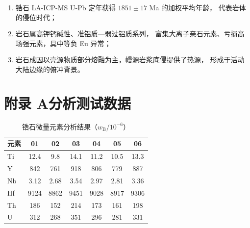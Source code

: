 \documentclass[master]{cugthesis}
\begin{document}
\begin{enumerate}
    \item 锆石 LA-ICP-MS U-Pb 定年获得 $1851\pm17$ Ma 的加权平均年龄，
        代表岩体的侵位时代；
    \item 岩石属高钾钙碱性、准铝质—弱过铝质系列，
        富集大离子亲石元素、亏损高场强元素，具中等负 Eu 异常；
    \item 岩石成因以壳源物质部分熔融为主，幔源岩浆底侵提供了热源，
        形成于活动大陆边缘的俯冲背景。
\end{enumerate}

\backmatter
\cugthesisacknowledgements

\appendix
\chapter{附录 A\quad 分析测试数据}

\begin{table}[htbp]
    \centering
    \caption{锆石微量元素分析结果（$w_\mathrm{B}$/$10^{-6}$）}
    \label{tab:appendix}
    \small
    \begin{tabular}{lcccccc}
        \toprule
        元素 & 01 & 02 & 03 & 04 & 05 & 06 \\
        \midrule
        Ti  & 12.4 & 9.8  & 14.1 & 11.2 & 10.5 & 13.3 \\
        Y   & 842  & 761  & 918  & 806  & 779  & 887  \\
        Nb  & 3.12 & 2.68 & 3.54 & 2.97 & 2.81 & 3.36 \\
        Hf  & 9124 & 8862 & 9451 & 9028 & 8917 & 9306 \\
        Th  & 186  & 152  & 214  & 173  & 161  & 198  \\
        U   & 312  & 268  & 351  & 296  & 281  & 331  \\
        \bottomrule
    \end{tabular}
\end{table}

%
\cugbookspine{10.7mm}
\end{document}
